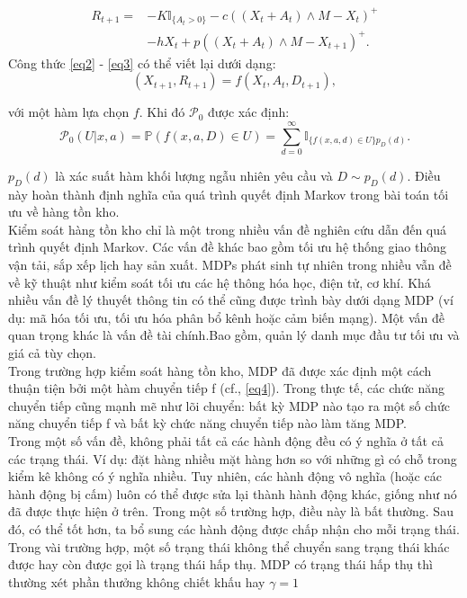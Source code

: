 \documentclass[14pt,a4paper,oneside]{report}		%
\begin{document}
\begin{equation} \label{eq3}
\begin{split}
R_{t+1} = & -K\mathbb{I}_{\{A_t>0\}}-c((X_t+A_t)\wedge M-X_t)^+ \\
& -hX_t + p((X_t+A_t)\wedge M-X_{t+1})^+.
\end{split}
\end{equation}
Công thức \ref{eq2} - \ref{eq3} có thể viết lại dưới dạng:
\begin{equation} \label{eq4}
(X_{t+1},R_{t+1})=f(X_t,A_t,D_{t+1}),
\end{equation}

với một hàm lựa chọn $f$. Khi đó $\mathcal{P}_0$ được xác định:
$$\mathcal{P}_0(U|x,a)=\mathbb{P}(f(x,a,D)\in U) = \displaystyle\sum^\infty_{d=0}{\mathbb{I}_{\{f(x,a,d)\in U\}p_D(d)}}.$$

$p_D(d)$ là xác suất hàm khối lượng ngẫu nhiên yêu cầu và $D\sim p_D(d)$. Điều này hoàn thành định nghĩa của quá trình quyết định Markov trong bài toán tối ưu về hàng tồn kho. \\

Kiểm soát hàng tồn kho chỉ là một trong nhiều vấn đề nghiên cứu dẫn đến quá trình quyết định Markov. Các vấn đề khác bao gồm tối ưu hệ thống giao thông vận tải, sắp xếp lịch hay sản xuất. MDPs phát sinh tự nhiên trong nhiều vẫn đề về kỹ thuật như kiểm soát tối ưu các hệ thông hóa học, điện tử, cơ khí. Khá nhiều vấn đề lý thuyết thông tin có thể cũng được trình bày dưới dạng MDP (ví dụ: mã hóa tối ưu, tối ưu hóa phân bổ kênh hoặc cảm biến mạng). Một vấn đề quan trọng khác là vấn đề tài chính.Bao gồm, quản lý danh mục đầu tư tối ưu và giá cả tùy chọn.\\
Trong trường hợp kiểm soát hàng tồn kho, MDP đã được xác định một cách thuận tiện bởi một hàm chuyển tiếp f (cf., \ref{eq4}). Trong thực tế, các chức năng chuyển tiếp cũng mạnh mẽ như lõi chuyển: bất kỳ MDP nào tạo ra một số chức năng chuyển tiếp f và bất kỳ chức năng chuyển tiếp nào làm tăng MDP.\\
Trong một số vấn đề, không phải tất cả các hành động đều có ý nghĩa ở tất cả các trạng thái. Ví dụ: đặt hàng nhiều mặt hàng hơn so với những gì có chỗ trong kiểm kê không có ý nghĩa nhiều. Tuy nhiên, các hành động vô nghĩa (hoặc các hành động bị cấm) luôn có thể được sửa lại thành hành động khác, giống như nó đã được thực hiện ở trên. Trong một số trường hợp, điều này là bất thường. Sau đó, có thể tốt hơn, ta bổ sung các hành động được chấp nhận cho mỗi trạng thái.
Trong vài trường hợp, một số trạng thái không thể chuyển sang trạng thái khác được hay còn được gọi là trạng thái hấp thụ. MDP có trạng thái hấp thụ thì thường xét phần thưởng không chiết khấu hay $\gamma =1$\\
\end{document}
